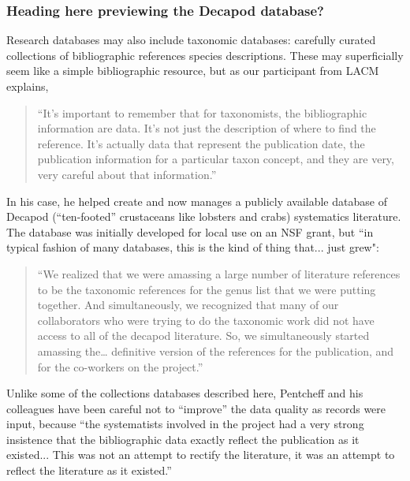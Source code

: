 \subsubsection{Heading here previewing the Decapod database?}
Research databases may also include taxonomic databases: carefully curated collections of bibliographic references species descriptions. These may superficially seem like a simple bibliographic resource, but as our participant from LACM explains,
\begin{quote}
“It’s important to remember that for taxonomists, the bibliographic information are data. It's not just the description of where to find the reference. It's actually data that represent the publication date, the publication information for a particular taxon concept, and they are very, very careful about that information.”
\end{quote}
In his case, he helped create and now manages a publicly available database of Decapod (“ten-footed” crustaceans like lobsters and crabs) systematics literature. The database was initially developed for local use on an NSF grant, but “in typical fashion of many databases, this is the kind of thing that... just grew":
\begin{quote}
“We realized that we were amassing a large number of literature references to be the taxonomic references for the genus list that we were putting together. And simultaneously, we recognized that many of our collaborators who were trying to do the taxonomic work did not have access to all of the decapod literature. So, we simultaneously started amassing the… definitive version of the references for the publication, and for the co-workers on the project.”
\end{quote}
Unlike some of the collections databases described here, Pentcheff and his colleagues have been careful not to “improve” the data quality as records were input, because “the systematists involved in the project had a very strong insistence that the bibliographic data exactly reflect the publication as it existed... This was not an attempt to rectify the literature, it was an attempt to reflect the literature as it existed.” 

